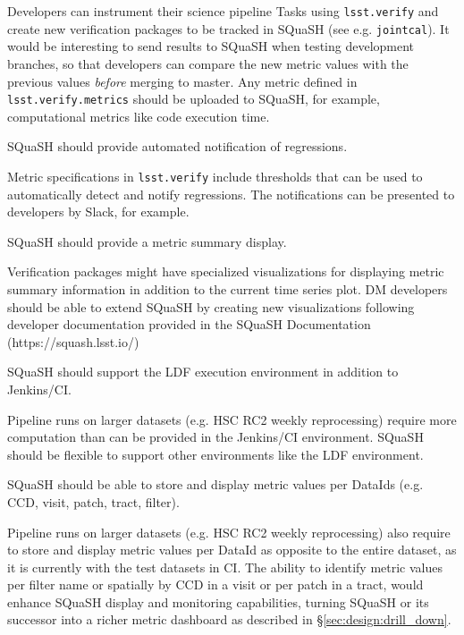 Developers can instrument their science pipeline Tasks using \texttt{lsst.verify} and create new verification packages to be tracked in SQuaSH (see e.g. \texttt{jointcal}). It would be interesting to send results to SQuaSH when testing development branches, so that developers can compare the new metric values with the previous values \textit{before} merging to master. Any metric defined in \texttt{lsst.verify.metrics} should be uploaded to SQuaSH, for example, computational metrics like code execution time.

\begin{recommendation}
SQuaSH should provide automated notification of regressions.
\end{recommendation}

Metric specifications in \texttt{lsst.verify} include thresholds that can be used to automatically detect and notify regressions. The notifications can be presented to developers by Slack, for example.

\begin{recommendation}
SQuaSH should provide a metric summary display.
\end{recommendation}

Verification packages might have specialized visualizations for displaying metric summary information in addition to the current time series plot. DM developers should be able to extend SQuaSH by creating new visualizations following developer documentation provided in the SQuaSH Documentation (https://squash.lsst.io/)

\begin{recommendation}
SQuaSH should support the LDF execution environment in addition to Jenkins/CI.
\end{recommendation}

Pipeline runs on larger datasets (e.g. HSC RC2 weekly reprocessing) require more computation than can be provided in the Jenkins/CI environment. SQuaSH should be flexible to support other environments like the LDF environment.

\begin{recommendation}
SQuaSH should be able to store and display metric values per DataIds (e.g. CCD, visit, patch, tract, filter).
\end{recommendation}

Pipeline runs on larger datasets (e.g. HSC RC2 weekly reprocessing) also require to store and display metric values per DataId as opposite to the entire dataset, as it is currently with the test datasets in CI. The ability to identify metric values per filter name or spatially by CCD in a visit or per patch in a tract, would enhance SQuaSH display and monitoring capabilities, turning SQuaSH or its successor into a richer metric dashboard as described in \S\ref{sec:design:drill_down}.


